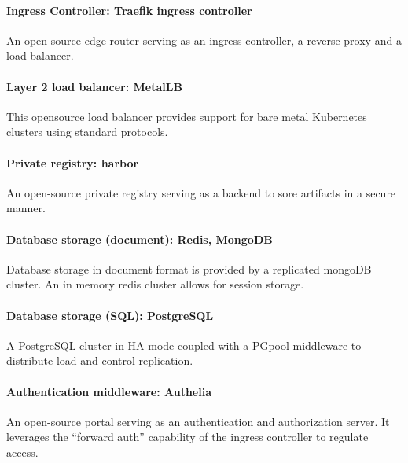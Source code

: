 \paragraph{Ingress Controller: Traefik ingress controller }

\hspace{7mm}An open-source edge router serving as an ingress controller, a reverse proxy and a load balancer. 

\paragraph{Layer 2 load balancer: MetalLB}

\hspace{7mm}This opensource load balancer provides support for bare metal Kubernetes clusters using standard protocols. 

\paragraph{Private registry: harbor }

\hspace{7mm}An open-source private registry serving as a backend to sore artifacts in a secure manner. 

\paragraph{Database storage (document): Redis, MongoDB }

\hspace{7mm}Database storage in document format is provided by a replicated mongoDB cluster. An in memory redis cluster allows for session storage. 

\paragraph{Database storage (SQL): PostgreSQL }

\hspace{7mm}A PostgreSQL cluster in HA mode coupled with a PGpool middleware to distribute load and control replication. 

\paragraph{Authentication middleware: Authelia }

\hspace{7mm}An open-source portal serving as an authentication and authorization server. It leverages the “forward auth” capability of the ingress controller to regulate access. 


